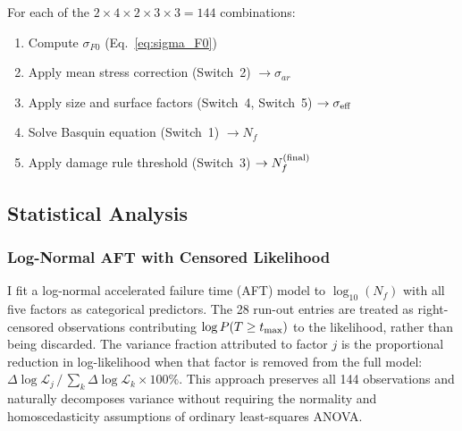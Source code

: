 \documentclass[12pt,a4paper]{article}
\begin{document}
For each of the $2\times4\times2\times3\times3 = 144$ combinations:
\begin{enumerate}
  \item Compute $\sigma_{F0}$ (Eq.~\ref{eq:sigma_F0})
  \item Apply mean stress correction (Switch~2) $\rightarrow \sigma_{ar}$
  \item Apply size and surface factors (Switch~4, Switch~5)
        $\rightarrow \sigma_{\rm eff}$
  \item Solve Basquin equation (Switch~1) $\rightarrow N_f$
  \item Apply damage rule threshold (Switch~3)
        $\rightarrow N_f^{\rm (final)}$
\end{enumerate}

\subsection{Statistical Analysis}

\subsubsection{Log-Normal AFT with Censored Likelihood}

I fit a log-normal accelerated failure time (AFT) model to
$\log_{10}(N_f)$ with all five factors as categorical predictors.
The 28 run-out entries are treated as right-censored observations
contributing $\log P(T \geq t_{\rm max})$ to the likelihood, rather
than being discarded. The variance fraction attributed to factor
$j$ is the proportional reduction in log-likelihood when that factor
is removed from the full model: $\Delta\log\mathcal{L}_j\,/\,
\sum_k \Delta\log\mathcal{L}_k \times 100\%$. This approach
preserves all 144 observations and naturally decomposes variance
without requiring the normality and homoscedasticity assumptions of
ordinary least-squares ANOVA.
\end{document}
